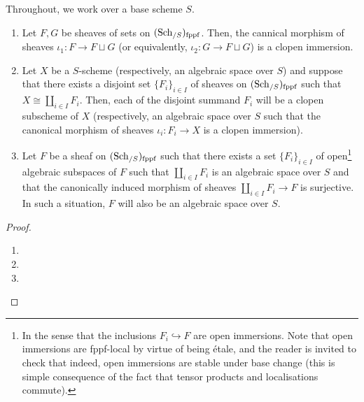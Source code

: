             \begin{lemma} \label{lemma: representability_by_schemes_and_algebraic_spaces_of_disjoint_summands}
                Throughout, we work over a base scheme $S$.
                \begin{enumerate}
                    \item Let $F, G$ be sheaves of sets on $(\mathrm{Sch}_{/S})_{\mathrm{fppf}}$. Then, the cannical morphism of sheaves $\iota_1: F \to F \sqcup G$ (or equivalently, $\iota_2: G \to F \sqcup G$) is a clopen immersion.
                    \item Let $X$ be a $S$-scheme (respectively, an algebraic space over $S$) and suppose that there exists a disjoint set $\{F_i\}_{i \in I}$ of sheaves on $(\mathrm{Sch}_{/S})_{\mathrm{fppf}}$ such that $X \cong \coprod_{i \in I} F_i$. Then, each of the disjoint summand $F_i$ will be a clopen subscheme of $X$ (respectively, an algebraic space over $S$ such that the canonical morphism of sheaves $\iota_i: F_i \to X$ is a clopen immersion).
                    \item Let $F$ be a sheaf on $(\mathrm{Sch}_{/S})_{\mathrm{fppf}}$ such that there exists a set $\{F_i\}_{i \in I}$ of open\footnote{In the sense that the inclusions $F_i \hookrightarrow F$ are open immersions. Note that open immersions are fppf-local by virtue of being \'etale, and the reader is invited to check that indeed, open immersions are stable under base change (this is simple consequence of the fact that tensor products and localisations commute).} algebraic subspaces of $F$ such that $\coprod_{i \in I} F_i$ is an algebraic space over $S$ and that the canonically induced morphism of sheaves $\coprod_{i \in I} F_i \to F$ is surjective. In such a situation, $F$ will also be an algebraic space over $S$.
                \end{enumerate}
            \end{lemma}
                \begin{proof}
                    \noindent
                    \begin{enumerate}
                        \item 
                        \item 
                        \item 
                    \end{enumerate}
                \end{proof}
                
